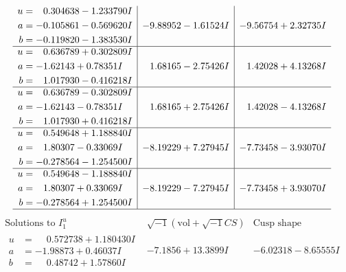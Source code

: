 \documentclass[1p]{elsarticle_modified}
\theoremstyle{definition}
\newcommand{\I}{\sqrt{-1}}
\begin{document}
$$\begin{array}{c|c|c}
\begin{aligned}
u &= \phantom{-}0.304638 - 1.233790 I \\
a &= -0.105861 - 0.569620 I \\
b &= -0.119820 - 1.383530 I\end{aligned}
 & -9.88952 - 1.61524 I & -9.56754 + 2.32735 I \\ \hline\begin{aligned}
u &= \phantom{-}0.636789 + 0.302809 I \\
a &= -1.62143 + 0.78351 I \\
b &= \phantom{-}1.017930 - 0.416218 I\end{aligned}
 & \phantom{-}1.68165 - 2.75426 I & \phantom{-}1.42028 + 4.13268 I \\ \hline\begin{aligned}
u &= \phantom{-}0.636789 - 0.302809 I \\
a &= -1.62143 - 0.78351 I \\
b &= \phantom{-}1.017930 + 0.416218 I\end{aligned}
 & \phantom{-}1.68165 + 2.75426 I & \phantom{-}1.42028 - 4.13268 I \\ \hline\begin{aligned}
u &= \phantom{-}0.549648 + 1.188840 I \\
a &= \phantom{-}1.80307 - 0.33069 I \\
b &= -0.278564 - 1.254500 I\end{aligned}
 & -8.19229 + 7.27945 I & -7.73458 - 3.93070 I \\ \hline\begin{aligned}
u &= \phantom{-}0.549648 - 1.188840 I \\
a &= \phantom{-}1.80307 + 0.33069 I \\
b &= -0.278564 + 1.254500 I\end{aligned}
 & -8.19229 - 7.27945 I & -7.73458 + 3.93070 I\\
 \hline 
 \end{array}$$\newpage$$\begin{array}{c|c|c}  
\text{Solutions to }I^u_{1}& \I (\text{vol} + \sqrt{-1}CS) & \text{Cusp shape}\\
 \hline 
\begin{aligned}
u &= \phantom{-}0.572738 + 1.180430 I \\
a &= -1.98873 + 0.46037 I \\
b &= \phantom{-}0.48742 + 1.57860 I\end{aligned}
 & -7.1856 + 13.3899 I & -6.02318 - 8.65555 I \\ \hline\begin{aligned}

\end{aligned}
\end{array}$$
\end{document}
